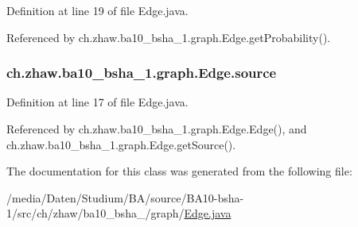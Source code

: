 Definition at line 19 of file Edge.java.

Referenced by ch.zhaw.ba10\_\-bsha\_\-1.graph.Edge.getProbability().\hypertarget{classch_1_1zhaw_1_1ba10__bsha__1_1_1graph_1_1Edge_a3593144bcc6c3034968a8608f11191f7}{
\subsubsection[{source}]{ {\bf ch.zhaw.ba10\_\-bsha\_\-1.graph.Edge.source}}}
\label{classch_1_1zhaw_1_1ba10__bsha__1_1_1graph_1_1Edge_a3593144bcc6c3034968a8608f11191f7}


Definition at line 17 of file Edge.java.

Referenced by ch.zhaw.ba10\_\-bsha\_\-1.graph.Edge.Edge(), and ch.zhaw.ba10\_\-bsha\_\-1.graph.Edge.getSource().

The documentation for this class was generated from the following file:\begin{DoxyCompactItemize}
\item 
/media/Daten/Studium/BA/source/BA10-\/bsha-\/1/src/ch/zhaw/ba10\_\-bsha\_/graph/\hyperlink{Edge_8java}{Edge.java}\end{DoxyCompactItemize}
